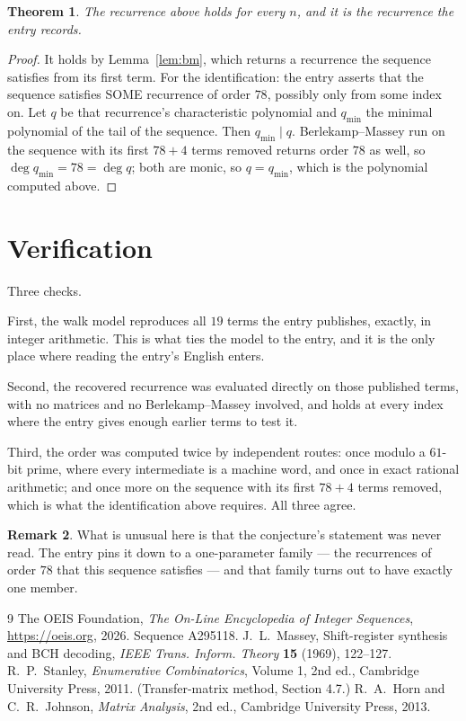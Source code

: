 \documentclass[11pt,a4paper]{article}
\theoremstyle{plain}
\newtheorem{theorem}{Theorem}
\theoremstyle{definition}
\newtheorem{remark}[theorem]{Remark}
\begin{document}
\begin{theorem}
The recurrence above holds for every $n$, and it is the recurrence the entry records.
\end{theorem}

\begin{proof}
It holds by Lemma~\ref{lem:bm}, which returns a recurrence the sequence satisfies from its
first term. For the identification: the entry asserts that the sequence satisfies SOME
recurrence of order $78$, possibly only from some index on. Let $q$ be that recurrence's
characteristic polynomial and $q_{\min}$ the minimal polynomial of the tail of the sequence.
Then $q_{\min}\mid q$. Berlekamp--Massey run on the sequence with its first $78+4$ terms
removed returns order $78$ as well, so $\deg q_{\min}=78=\deg q$; both are monic, so
$q=q_{\min}$, which is the polynomial computed above.
\end{proof}

\section{Verification}

Three checks.

First, the walk model reproduces all $19$ terms the entry publishes, exactly, in integer
arithmetic. This is what ties the model to the entry, and it is the only place where reading
the entry's English enters.

Second, the recovered recurrence was evaluated directly on those published terms, with no
matrices and no Berlekamp--Massey involved, and holds at every index where the entry gives
enough earlier terms to test it.

Third, the order was computed twice by independent routes: once modulo a $61$-bit prime, where
every intermediate is a machine word, and once in exact rational arithmetic; and once more on
the sequence with its first $78+4$ terms removed, which is what the identification above
requires. All three agree.

\begin{remark}
What is unusual here is that the conjecture's statement was never read. The entry pins it down
to a one-parameter family --- the recurrences of order $78$ that this sequence satisfies
--- and that family turns out to have exactly one member.
\end{remark}

\begin{thebibliography}{9}
 The OEIS Foundation, \emph{The On-Line Encyclopedia of Integer
Sequences}, \url{https://oeis.org}, 2026. Sequence A295118.
 J.~L.~Massey, Shift-register synthesis and BCH decoding, \emph{IEEE
Trans. Inform. Theory} \textbf{15} (1969), 122--127.
 R.~P.~Stanley, \emph{Enumerative Combinatorics}, Volume 1, 2nd ed.,
Cambridge University Press, 2011. (Transfer-matrix method, Section 4.7.)
 R.~A.~Horn and C.~R.~Johnson, \emph{Matrix Analysis}, 2nd ed., Cambridge
University Press, 2013.
\end{thebibliography}
\end{document}

